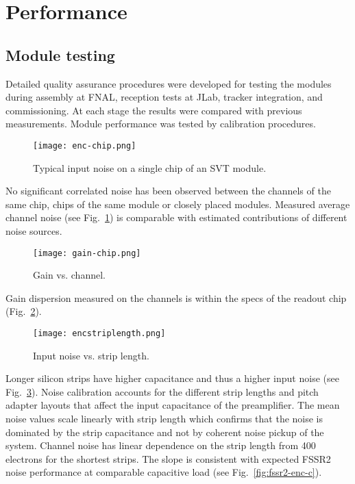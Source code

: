 \section{Performance}

\subsection{Module testing}

Detailed quality assurance procedures were developed for testing the modules during assembly at FNAL, reception tests at JLab, tracker integration, and commissioning. At each stage the results were compared with previous measurements. Module performance was tested by calibration procedures. 

\begin{figure}[hbt] 
\centering 
\texttt{[image: enc-chip.png]}
\caption{Typical input noise on a single chip of an SVT module.}
\label{fig:enc-chip}
\end{figure}

No significant correlated noise has been observed between the channels of the same chip, chips of the same module or closely placed modules. Measured average channel noise (see Fig.~\ref{fig:enc-chip}) is comparable with estimated contributions of different noise sources. 

\begin{figure}[hbt] 
\centering 
\texttt{[image: gain-chip.png]}
\caption{Gain vs. channel.}
\label{fig:gain-chip}
\end{figure}

Gain dispersion measured on the channels is within the specs of the readout chip (Fig.~\ref{fig:gain-chip}).

\begin{figure}[hbt] 
	\centering 
	\texttt{[image: encstriplength.png]}
	\caption{Input noise vs. strip length.}
	\label{fig:encstriplength}
\end{figure}

Longer silicon strips have higher capacitance and thus a higher input noise (see Fig.~\ref{fig:encstriplength}). Noise calibration accounts for the different strip lengths and pitch adapter layouts that affect the input capacitance of the preamplifier. The mean noise values scale linearly with strip length which confirms that the noise is dominated by the strip capacitance and not by coherent noise pickup of the system. Channel noise has linear dependence on the strip length from 400 electrons for the shortest strips. The slope is consistent with expected FSSR2 noise performance at comparable capacitive load (see Fig.~\ref{fig:fssr2-enc-c}).

